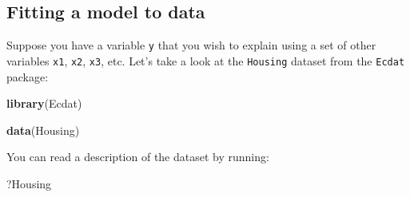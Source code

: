 \documentclass[]{gitbook}
\newenvironment{Shaded}{\begin{snugshade}}{\end{snugshade}}
\newcommand{\KeywordTok}[1]{\textcolor[rgb]{0.13,0.29,0.53}{\textbf{#1}}}
\newcommand{\NormalTok}[1]{#1}
\theoremstyle{definition}
\theoremstyle{definition}
\theoremstyle{definition}
\theoremstyle{remark}
\begin{document}
\hypertarget{fitting-a-model-to-data}{%
\subsection{Fitting a model to data}\label{fitting-a-model-to-data}}

Suppose you have a variable \texttt{y} that you wish to explain using a
set of other variables \texttt{x1}, \texttt{x2}, \texttt{x3}, etc. Let's
take a look at the \texttt{Housing} dataset from the \texttt{Ecdat}
package:

\begin{Shaded}
\begin{Highlighting}[]
\KeywordTok{library}\NormalTok{(Ecdat)}

\KeywordTok{data}\NormalTok{(Housing)}
\end{Highlighting}
\end{Shaded}

You can read a description of the dataset by running:

\begin{Shaded}
\begin{Highlighting}[]
\NormalTok{?Housing}
\end{Highlighting}
\end{Shaded}
\end{document}

